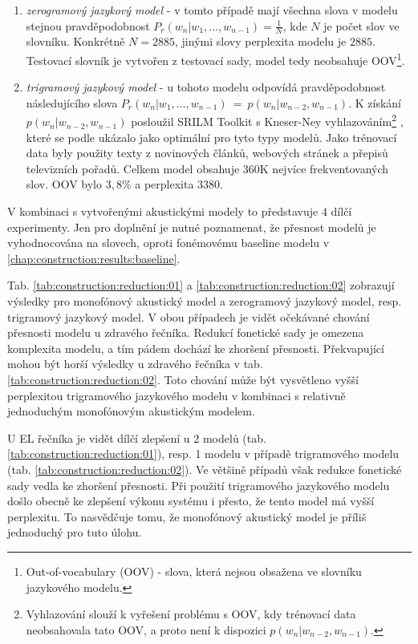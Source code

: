 \begin{enumerate}
  \item \textit{zerogramový jazykový model} - v tomto případě mají všechna slova v modelu stejnou pravděpodobnost $P_r(w_n|w_1,\dots,w_{n-1}) = \frac{1}{N}$, kde $N$ je počet slov ve slovníku. Konkrétně $N = 2885$, jinými slovy perplexita modelu je $2885$. Testovací slovník je vytvořen z testovací sady, model tedy neobsahuje OOV\footnote{Out-of-vocabulary (OOV) - slova, která nejsou obsažena ve slovníku jazykového modelu.}.
  \item \textit{trigramový jazykový model} - u tohoto modelu odpovídá pravděpodobnost následujícího slova $P_r(w_n|w_1,\dots,w_{n-1})~=~p(w_n|w_{n-2}, w_{n-1})$. K získání $p(w_n|w_{n-2}, w_{n-1})$ posloužil SRILM Toolkit s Kneser-Ney vyhlazováním\footnote{Vyhlazování slouží k vyřešení problému s OOV, kdy trénovací data neobsahovala tato OOV, a proto není k dispozici $p(w_n|w_{n-2}, w_{n-1})$.} \cite{Stolcke2002}, které se podle \cite{Prazak2008} ukázalo jako optimální pro tyto typy modelů. Jako trénovací data byly použity texty z novinových článků, webových stránek a přepisů televizních pořadů. Celkem model obsahuje 360K nejvíce frekventovaných slov. OOV bylo $3,8 \%$ a perplexita $3380$.
\end{enumerate}

\noindent V kombinaci s vytvořenými akustickými modely to představuje 4 dílčí experimenty. Jen pro doplnění je nutné poznamenat, že přesnost modelů je vyhodnocována na slovech, oproti fonémovému baseline modelu v \ref{chap:construction:results:baseline}.

Tab. \ref{tab:construction:reduction:01} a \ref{tab:construction:reduction:02} zobrazují výsledky pro monofónový akustický model a zerogramový jazykový model, resp. trigramový jazykový model. V obou případech je vidět očekávané chování přesnosti modelu u zdravého řečníka. Redukcí fonetické sady je omezena komplexita modelu, a tím pádem dochází ke zhoršení přesnosti. Překvapující mohou být horší výsledky u zdravého řečníka v tab. \ref{tab:construction:reduction:02}. Toto chování může být vysvětleno vyšší perplexitou trigramového jazykového modelu v kombinaci s relativně jednoduchým monofónovým akustickým modelem.

U EL řečníka je vidět dílčí zlepšení u 2 modelů (tab. \ref{tab:construction:reduction:01}), resp. 1 modelu v případě trigramového modelu (tab. \ref{tab:construction:reduction:02}). Ve většině případů však redukce fonetické sady vedla ke zhoršení přesnosti. Při použití trigramového jazykového modelu došlo obecně ke zlepšení výkonu systému i přesto, že tento model má vyšší perplexitu. To nasvědčuje tomu, že monofónový akustický model je příliš jednoduchý pro tuto úlohu.

